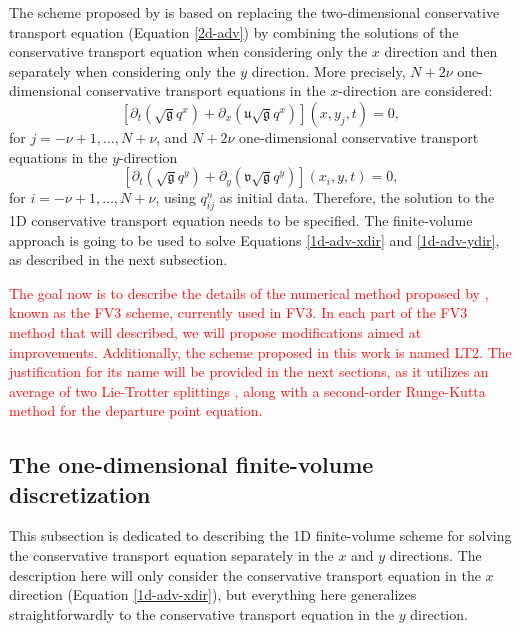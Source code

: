 \documentclass[preprint,12pt]{elsarticle}
\begin{document}
\begin{linenumbers}
The scheme proposed by \cite{lin:1996} is based on replacing the two-dimensional conservative transport equation (Equation \eqref{2d-adv}) by combining the solutions of the conservative transport equation when considering only the $x$ direction and then separately when considering only the $y$ direction.
More precisely, $N+2\nu$ one-dimensional conservative transport equations in the $x$-direction are considered:
\begin{equation}
	\label{1d-adv-xdir}
	[{\partial_t (\sqrt{\mathfrak{g}}q^x)}+{\partial_x (\mathfrak{u}\sqrt{\mathfrak{g}}q^x)}](x, y_j, t) = 0,
\end{equation}
for $j=-\nu+1, \ldots, N + \nu$, and
$N+2\nu$ one-dimensional conservative transport equations in the $y$-direction
\begin{equation}
	\label{1d-adv-ydir}
	[{\partial_t (\sqrt{\mathfrak{g}}q^y)} +{\partial_y (\mathfrak{v}\sqrt{\mathfrak{g}}q^y)}](x_i, y, t) = 0,
\end{equation}
for $i=-\nu+1, \ldots, N + \nu$, using $q_{ij}^n$ as initial data.
Therefore, the solution to the 1D conservative transport equation needs to be specified.
The finite-volume approach is going to be used to solve Equations \ref{1d-adv-xdir} and \ref{1d-adv-ydir}, as described in the next subsection.

\textcolor{red}
{
The goal now is to describe the details of the numerical method proposed by \citep{putman:2007}, known as the FV3 scheme, currently used in FV3.
In each part of the FV3 method that will described, we will propose modifications aimed at improvements. 
Additionally, the scheme proposed in this work is named LT2.
The justification for its name will be provided in the next sections, as it utilizes an average of two Lie-Trotter splittings \cite{holden:2010}, along with a second-order Runge-Kutta method for the departure point equation.
}

\subsection{The one-dimensional finite-volume discretization}
\label{1d-adv}
This subsection is dedicated to describing the 1D finite-volume scheme for solving the conservative transport equation separately in the $x$ and $y$ directions.
The description here will only consider the conservative transport equation in the $x$ direction (Equation \ref{1d-adv-xdir}), but everything here generalizes straightforwardly to the conservative transport equation in the $y$ direction.


\end{linenumbers}
\end{document}
